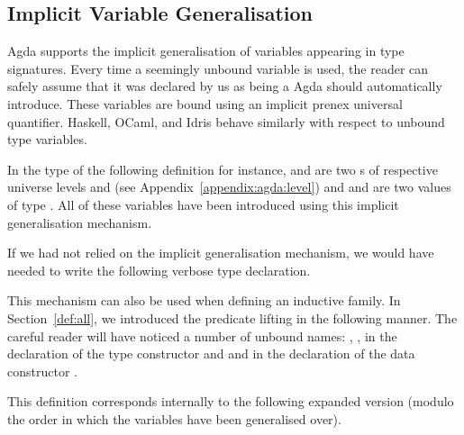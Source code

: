 
\subsection{Implicit Variable Generalisation}\label{appendix:agda:variable}

Agda supports the implicit generalisation of variables appearing in type
signatures. Every time a seemingly unbound variable is used, the reader can
safely assume that it was declared by us as being a  Agda should
automatically introduce. These variables are bound using an implicit
prenex universal quantifier. Haskell, OCaml, and Idris behave similarly with
respect to unbound type variables.

In the type of the following definition for instance,  and  are
two s of respective universe levels  and  (see
Appendix~\ref{appendix:agda:level}) and  and  are two values of
type . All of these variables have been introduced using this implicit
generalisation mechanism.


If we had not relied on the implicit generalisation mechanism, we would have
needed to write the following verbose type declaration.


This mechanism can also be used when defining an inductive family.
In Section~\ref{def:all}, we introduced the predicate lifting 
in the following manner. The careful reader will have noticed a
number of unbound names: , ,  in the declaration
of the type constructor and  and  in the declaration of
the data constructor \AIC{\_::\_}.


This definition corresponds internally to the following expanded
version (modulo the order in which the variables have been generalised
over).

